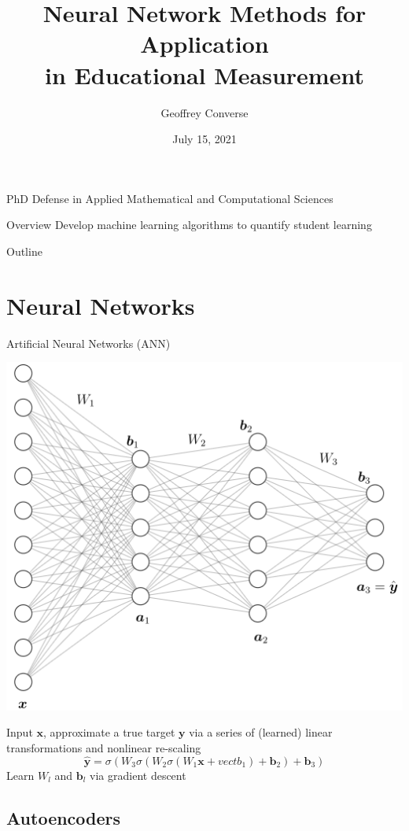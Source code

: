 \documentclass{beamer}
\title[Neural Network Methods for Application in Educational Measurement]{Neural Network Methods for Application \\ in Educational Measurement}
\author{Geoffrey Converse}
\institute{University of Iowa}
\date{July 15, 2021}
\newcommand{\vect}[1]{\boldsymbol{#1}}
\theoremstyle{definition}
\begin{document}
\begin{frame}
  \titlepage
  \begin{center}
  {\scriptsize PhD Defense in Applied Mathematical and Computational Sciences}
  \end{center}
\end{frame}

\begin{frame}{Overview}
  Develop machine learning algorithms to quantify student learning
\end{frame}

\begin{frame}{Outline}
  \scriptsize
  \tableofcontents
\end{frame}

\section{Neural Networks}

\begin{frame}{Artificial Neural Networks (ANN)}
\begin{center}
  \includegraphics[width=.55\textwidth]{../img/ffn_visual.png}
\end{center}
Input $\vect x$, approximate a true target $\vect y$ via a series of (learned) linear transformations and nonlinear re-scaling
\[\hat{\vect y} = \sigma(W_3\sigma(W_2\sigma(W_1 \vect x + vect b_1) + \vect b_2) + \vect b_3)\]
Learn $W_l$ and $\vect b_l$ via gradient descent
\end{frame}

\subsection{Autoencoders}
\end{document}
